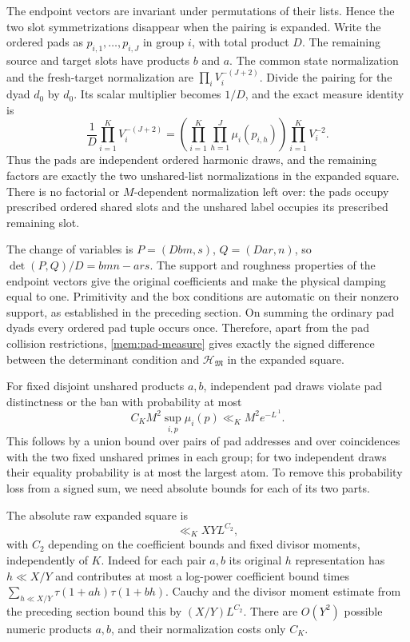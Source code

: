 The endpoint vectors are invariant under permutations of their
lists. Hence the two slot symmetrizations disappear when the pairing
is expanded. Write the ordered pads as $p_{i,1},\ldots,p_{i,J}$ in
group $i$, with total product $D$. The remaining source and target
slots have products $b$ and $a$. The common state normalization and
the fresh-target normalization are
$\prod_i V_i^{-(J+2)}$. Divide the pairing for the dyad $d_0$ by
$d_0$. Its scalar multiplier becomes $1/D$, and the exact measure
identity is
\begin{equation}\label{mem:pad-measure}
 \frac1D\prod_{i=1}^K V_i^{-(J+2)}
   =\left(\prod_{i=1}^K\prod_{h=1}^J\mu_i(p_{i,h})\right)
      \prod_{i=1}^K V_i^{-2}.
\end{equation}
Thus the pads are independent ordered harmonic draws, and the
remaining factors are exactly the two unshared-list normalizations
in the expanded square. There is no factorial or $M$-dependent
normalization left over: the pads occupy prescribed ordered shared
slots and the unshared label occupies its prescribed remaining slot.

The change of variables is $P=(Dbm,s)$, $Q=(Dar,n)$, so
$\det(P,Q)/D=bmn-ars$. The support and roughness properties of the
endpoint vectors give the original coefficients and make the
physical damping equal to one. Primitivity and the box conditions
are automatic on their nonzero support, as established in the
preceding section. On summing the ordinary pad dyads every ordered
pad tuple occurs once. Therefore, apart from the pad collision
restrictions, \eqref{mem:pad-measure} gives exactly the signed
difference between the determinant condition and
$\mathcal H_{\mathfrak M}$ in the expanded square.

For fixed disjoint unshared products $a,b$, independent pad draws
violate pad distinctness or the ban with probability at most
\begin{equation}\label{mem:pad-collisions}
 C_K M^2\sup_{i,p}\mu_i(p)
       \ll_K M^2e^{-L^{.1}}.
\end{equation}
This follows by a union bound over pairs of pad addresses and over
coincidences with the two fixed unshared primes in each group; for
two independent draws their equality probability is at most the
largest atom. To remove this probability loss from a signed sum,
we need absolute bounds for each of its two parts.

The absolute raw expanded square is
\begin{equation}\label{mem:raw-absolute-square}
 \ll_K XY L^{C_2},
\end{equation}
with $C_2$ depending on the coefficient bounds and fixed divisor
moments, independently of $K$. Indeed for each pair $a,b$ its original
$h$ representation has $h\ll X/Y$ and contributes at most a
log-power coefficient bound times
$\sum_{h\ll X/Y}\tau(1+ah)\tau(1+bh)$.
Cauchy and the divisor moment estimate from the preceding section
bound this by $(X/Y)L^{C_2}$. There are $O(Y^2)$ possible numeric
products $a,b$, and their normalization costs only $C_K$.

